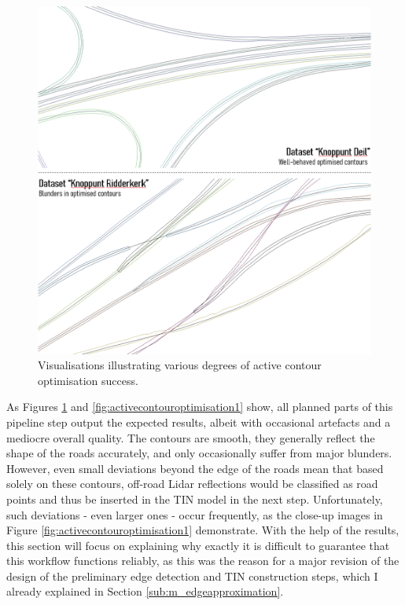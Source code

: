\begin{figure}[]
    \centering
    \includegraphics[width=0.9\linewidth]{final_report/figs/activecontouroptimisation0.png}
    \caption{Visualisations illustrating various degrees of active contour optimisation success.}
    \label{fig:activecontouroptimisation0}
\end{figure}

As Figures \ref{fig:activecontouroptimisation0} and \ref{fig:activecontouroptimisation1} show, all planned parts of this pipeline step output the expected results, albeit with occasional artefacts and a mediocre overall quality. The contours are smooth, they generally reflect the shape of the roads accurately, and only occasionally suffer from major blunders. However, even small deviations beyond the edge of the roads mean that based solely on these contours, off-road Lidar reflections would be classified as road points and thus be inserted in the TIN model in the next step. Unfortunately, such deviations - even larger ones - occur frequently, as the close-up images in Figure \ref{fig:activecontouroptimisation1} demonstrate. With the help of the results, this section will focus on explaining why exactly it is difficult to guarantee that this workflow functions reliably, as this was the reason for a major revision of the design of the preliminary edge detection and TIN construction steps, which I already explained in Section \ref{sub:m_edgeapproximation}.

